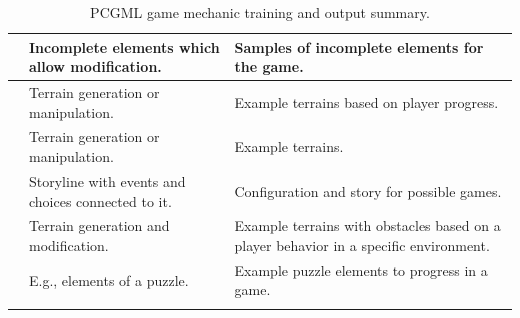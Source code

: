 \documentclass[MGS,Master,english]{twbook}%
\begin{document}
\begin{longtable}[c]{p{4cm}|p{5.5cm}|p{5.5cm}|}
		\multicolumn{1}{|p{4cm}|}{\textbf{\nameref{idea::buildingWithAssistance}}} & Incomplete elements which allow modification.        & Samples of incomplete elements for the game.                                          \\ \hline
		\multicolumn{1}{|p{4cm}|}{\textbf{\nameref{idea::exploringCoWorker}}}      & Terrain generation or manipulation.                  & Example terrains based on player progress.                                            \\ \hline
		\multicolumn{1}{|p{4cm}|}{\textbf{\nameref{idea::observeAndLearn}}}        & Terrain generation or manipulation.                  & Example terrains.                                                                     \\ \hline
		\multicolumn{1}{|p{4cm}|}{\textbf{\nameref{idea::expressYourself}} }       & Storyline with events and choices connected to it.   & Configuration and story for possible games.                                           \\ \hline
		\multicolumn{1}{|p{4cm}|}{\textbf{\nameref{idea::bigBossHelper}} }         & Terrain generation and modification.                 & Example terrains with obstacles based on a player behavior in a specific environment. \\ \hline
		\multicolumn{1}{|p{4cm}|}{\textbf{\nameref{idea::figureItOut}} }           & E.g., elements of a puzzle.                          & Example puzzle elements to progress in a game.                                        \\ \hline

	\caption{\ac{PCGML} game mechanic training and output summary.}
\end{longtable}
\end{document}
